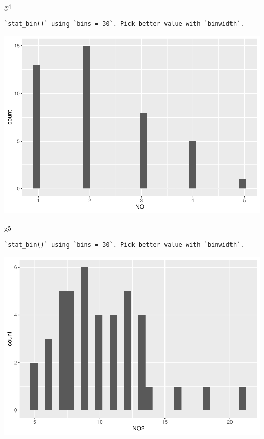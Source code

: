 \documentclass[
]{article}
\newenvironment{Shaded}{\begin{snugshade}}{\end{snugshade}}
\newcommand{\NormalTok}[1]{#1}
\begin{document}
\begin{Shaded}
\begin{Highlighting}[]
\NormalTok{g4}
\end{Highlighting}
\end{Shaded}

\begin{verbatim}
`stat_bin()` using `bins = 30`. Pick better value with `binwidth`.
\end{verbatim}

\includegraphics{Tarea1_files/figure-latex/unnamed-chunk-9-5.pdf}

\begin{Shaded}
\begin{Highlighting}[]
\NormalTok{g5}
\end{Highlighting}
\end{Shaded}

\begin{verbatim}
`stat_bin()` using `bins = 30`. Pick better value with `binwidth`.
\end{verbatim}

\includegraphics{Tarea1_files/figure-latex/unnamed-chunk-9-6.pdf}
\end{document}
